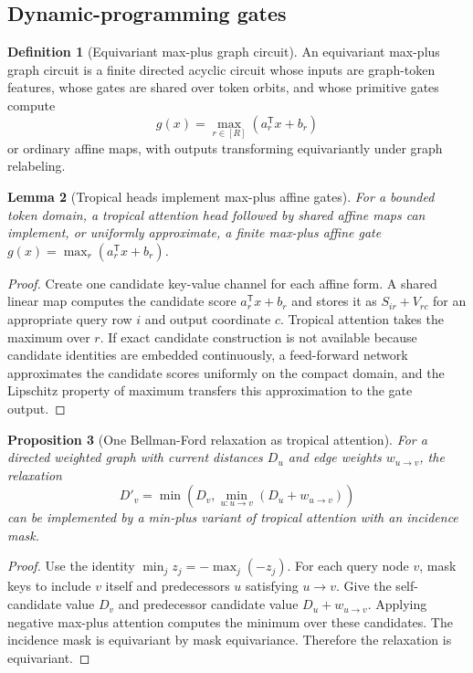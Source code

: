 \documentclass[11pt]{article}
\theoremstyle{definition}
\newtheorem{definition}{Definition}[section]
\theoremstyle{plain}
\newtheorem{lemma}[definition]{Lemma}
\newtheorem{proposition}[definition]{Proposition}
\theoremstyle{remark}
\numberwithin{equation}{section}
\newcommand{\transpose}{^{\mathsf T}}
\begin{document}
\subsection{Dynamic-programming gates}

\begin{definition}[Equivariant max-plus graph circuit]
An equivariant max-plus graph circuit is a finite directed acyclic circuit whose inputs are graph-token features, whose gates are shared over token orbits, and whose primitive gates compute
\begin{equation}
  g(x)=\max_{r\in[R]}(a_r\transpose x+b_r)
\end{equation}
or ordinary affine maps, with outputs transforming equivariantly under graph relabeling.
\end{definition}

\begin{lemma}[Tropical heads implement max-plus affine gates]
For a bounded token domain, a tropical attention head followed by shared affine maps can implement, or uniformly approximate, a finite max-plus affine gate $g(x)=\max_r(a_r\transpose x+b_r)$.
\end{lemma}

\begin{proof}
Create one candidate key-value channel for each affine form.  A shared linear map computes the candidate score $a_r\transpose x+b_r$ and stores it as $S_{ir}+V_{rc}$ for an appropriate query row $i$ and output coordinate $c$.  Tropical attention takes the maximum over $r$.  If exact candidate construction is not available because candidate identities are embedded continuously, a feed-forward network approximates the candidate scores uniformly on the compact domain, and the Lipschitz property of maximum transfers this approximation to the gate output.
\end{proof}

\begin{proposition}[One Bellman-Ford relaxation as tropical attention]
For a directed weighted graph with current distances $D_u$ and edge weights $w_{u\to v}$, the relaxation
\begin{equation}
  D'_v=\min\left(D_v,\min_{u:u\to v}(D_u+w_{u\to v})\right)
\end{equation}
can be implemented by a min-plus variant of tropical attention with an incidence mask.
\end{proposition}

\begin{proof}
Use the identity $\min_j z_j=-\max_j(-z_j)$.  For each query node $v$, mask keys to include $v$ itself and predecessors $u$ satisfying $u\to v$.  Give the self-candidate value $D_v$ and predecessor candidate value $D_u+w_{u\to v}$.  Applying negative max-plus attention computes the minimum over these candidates.  The incidence mask is equivariant by mask equivariance.  Therefore the relaxation is equivariant.
\end{proof}
\end{document}
